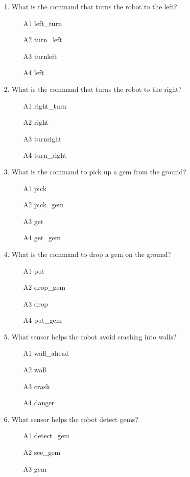 \begin{enumerate}
\begin{enumerate}
\end{enumerate}
\item What is the command that turns the robot to the left?
\begin{enumerate}
\item[A1] left\_turn
\item[A2] turn\_left
\item[A3] turnleft
\item[A4] left
\end{enumerate}
\item What is the command that turns the robot to the right?
\begin{enumerate}
\item[A1] right\_turn
\item[A2] right
\item[A3] turnright
\item[A4] turn\_right
\end{enumerate}
\item What is the command to pick up a gem from the ground?
\begin{enumerate}
\item[A1] pick
\item[A2] pick\_gem
\item[A3] get
\item[A4] get\_gem
\end{enumerate}
\item What is the command to drop a gem on the ground?
\begin{enumerate}
\item[A1] put
\item[A2] drop\_gem
\item[A3] drop 
\item[A4] put\_gem
\end{enumerate}
\item What sensor helps the robot avoid crashing into walls?
\begin{enumerate}
\item[A1] wall\_ahead
\item[A2] wall
\item[A3] crash
\item[A4] danger
\end{enumerate}
\item What sensor helps the robot detect gems?
\begin{enumerate}
\item[A1] detect\_gem
\item[A2] see\_gem
\item[A3] gem

\end{enumerate}
\end{enumerate}
